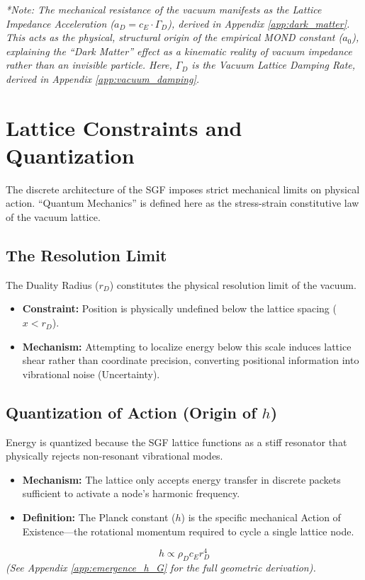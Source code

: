 \textit{*Note: The mechanical resistance of the vacuum manifests as the Lattice Impedance Acceleration ($a_D = c_E \cdot \Gamma_D$), derived in Appendix \ref{app:dark_matter}. This acts as the physical, structural origin of the empirical MOND constant ($a_0$), explaining the ``Dark Matter'' effect as a kinematic reality of vacuum impedance rather than an invisible particle. Here, $\Gamma_D$ is the Vacuum Lattice Damping Rate, derived in Appendix \ref{app:vacuum_damping}.}

\chapter{Lattice Constraints and Quantization}
The discrete architecture of the SGF imposes strict mechanical limits on physical action. ``Quantum Mechanics'' is defined here as the stress-strain constitutive law of the vacuum lattice.

\section{The Resolution Limit}
The Duality Radius ($r_D$) constitutes the physical resolution limit of the vacuum.
\begin{itemize}
    \item \textbf{Constraint:} Position is physically undefined below the lattice spacing ($x < r_D$).
    \item \textbf{Mechanism:} Attempting to localize energy below this scale induces lattice shear rather than coordinate precision, converting positional information into vibrational noise (Uncertainty).
\end{itemize}

\section{Quantization of Action (Origin of $h$)}
Energy is quantized because the SGF lattice functions as a stiff resonator that physically rejects non-resonant vibrational modes.
\begin{itemize}
    \item \textbf{Mechanism:} The lattice only accepts energy transfer in discrete packets sufficient to activate a node's harmonic frequency.
    \item \textbf{Definition:} The Planck constant ($h$) is the specific mechanical Action of Existence---the rotational momentum required to cycle a single lattice node.
\end{itemize}
\begin{equation}
h \propto \rho_D c_E r_D^4
\end{equation}
\textit{(See Appendix \ref{app:emergence_h_G} for the full geometric derivation).}

